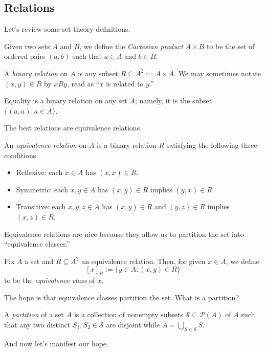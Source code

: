 \subsection{Relations}
Let's review some set theory definitions.
\begin{definition}
	Given two sets $A$ and $B$, we define the \textit{Cartesian product} $A\times B$ to be the set of ordered pairs $(a,b)$ such that $a\in A$ and $b\in B$.
\end{definition}
\begin{definition}
	A \textit{binary relation} on $A$ is any subset $R\subseteq A^2:=A\times A$. We may sometimes notate $(x,y)\in R$ by $xRy$, read as ``$x$ is related to $y$.''
\end{definition}
\begin{example}
	Equality is a binary relation on any set $A$; namely, it is the subset $\{(a,a):a\in A\}$.
\end{example}
The best relations are equivalence relations.
\begin{definition}
	An \textit{equivalence relation} on $A$ is a binary relation $R$ satisfying the following three conditions.
	\begin{itemize}
		\item Reflexive: each $x\in A$ has $(x,x)\in R$.
		\item Symmetric: each $x,y\in A$ has $(x,y)\in R$ implies $(y,x)\in R$.
		\item Transitive: each $x,y,z\in A$ has $(x,y)\in R$ and $(y,z)\in R$ implies $(x,z)\in R$.
	\end{itemize}
\end{definition}
Equivalence relations are nice because they allow us to partition the set into ``equivalence classes.''
\begin{defi}
	Fix $A$ a set and $R\subseteq A^2$ an equivalence relation. Then, for given $x\in A$, we define
	\[[x]_R:=\{y\in A:(x,y)\in R\}\]
	to be the \textit{equivalence class} of $x$.
\end{defi}
The hope is that equivalence classes partition the set. What is a partition?
\begin{definition}[Parition]
	A \textit{partition} of a set $A$ is a collection of nonempty subsets $\mathcal S\subseteq\mathcal P(A)$ of $A$ such that any two distinct $S_1,S_2\in\mathcal S$ are disjoint while $A=\bigcup_{S\in\mathcal S}S$.
\end{definition}
And now let's manifest our hope.
